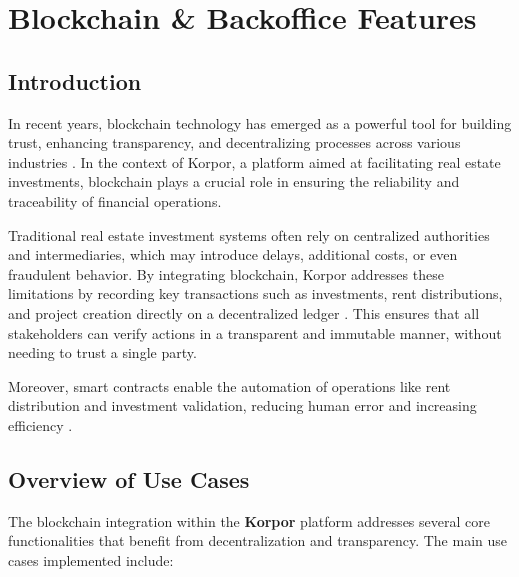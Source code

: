 \chapter{Blockchain \& Backoffice Features}

\section*{Introduction}

In recent years, blockchain technology has emerged as a powerful tool for building trust, enhancing transparency, and decentralizing processes across various industries \cite{Nakamoto2008Bitcoin, Tapscott2016Blockchain}. In the context of Korpor, a platform aimed at facilitating real estate investments, blockchain plays a crucial role in ensuring the reliability and traceability of financial operations.

Traditional real estate investment systems often rely on centralized authorities and intermediaries, which may introduce delays, additional costs, or even fraudulent behavior. By integrating blockchain, Korpor addresses these limitations by recording key transactions such as investments, rent distributions, and project creation directly on a decentralized ledger \cite{Veuger2018RealEstateBlockchain}. This ensures that all stakeholders can verify actions in a transparent and immutable manner, without needing to trust a single party.

Moreover, smart contracts enable the automation of operations like rent distribution and investment validation, reducing human error and increasing efficiency \cite{Buterin2014Ethereum, Szabo1997SmartContracts}.

\section{Overview of Use Cases}

The blockchain integration within the \textbf{\textcolor{primary}{Korpor}} platform addresses several core functionalities that benefit from decentralization and transparency. The main use cases implemented include:

